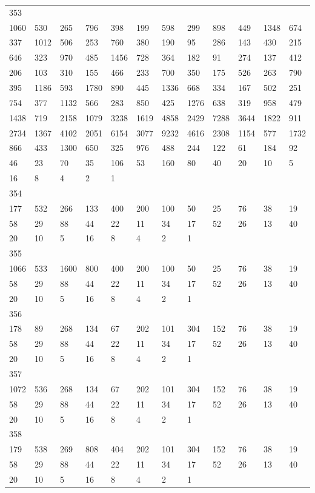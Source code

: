 \begin{longtable}{llllllllllll}
353&&&&&&&&&&&\\
1060& 530& 265& 796& 398& 199& 598& 299& 898& 449& 1348& 674\\
337& 1012& 506& 253& 760& 380& 190& 95& 286& 143& 430& 215\\
646& 323& 970& 485& 1456& 728& 364& 182& 91& 274& 137& 412\\
206& 103& 310& 155& 466& 233& 700& 350& 175& 526& 263& 790\\
395& 1186& 593& 1780& 890& 445& 1336& 668& 334& 167& 502& 251\\
754& 377& 1132& 566& 283& 850& 425& 1276& 638& 319& 958& 479\\
1438& 719& 2158& 1079& 3238& 1619& 4858& 2429& 7288& 3644& 1822& 911\\
2734& 1367& 4102& 2051& 6154& 3077& 9232& 4616& 2308& 1154& 577& 1732\\
866& 433& 1300& 650& 325& 976& 488& 244& 122& 61& 184& 92\\
46& 23& 70& 35& 106& 53& 160& 80& 40& 20& 10& 5\\
16& 8& 4& 2& 1& \\

354&&&&&&&&&&&\\
177& 532& 266& 133& 400& 200& 100& 50& 25& 76& 38& 19\\
58& 29& 88& 44& 22& 11& 34& 17& 52& 26& 13& 40\\
20& 10& 5& 16& 8& 4& 2& 1& \\

355&&&&&&&&&&&\\
1066& 533& 1600& 800& 400& 200& 100& 50& 25& 76& 38& 19\\
58& 29& 88& 44& 22& 11& 34& 17& 52& 26& 13& 40\\
20& 10& 5& 16& 8& 4& 2& 1& \\

356&&&&&&&&&&&\\
178& 89& 268& 134& 67& 202& 101& 304& 152& 76& 38& 19\\
58& 29& 88& 44& 22& 11& 34& 17& 52& 26& 13& 40\\
20& 10& 5& 16& 8& 4& 2& 1& \\

357&&&&&&&&&&&\\
1072& 536& 268& 134& 67& 202& 101& 304& 152& 76& 38& 19\\
58& 29& 88& 44& 22& 11& 34& 17& 52& 26& 13& 40\\
20& 10& 5& 16& 8& 4& 2& 1& \\

358&&&&&&&&&&&\\
179& 538& 269& 808& 404& 202& 101& 304& 152& 76& 38& 19\\
58& 29& 88& 44& 22& 11& 34& 17& 52& 26& 13& 40\\
20& 10& 5& 16& 8& 4& 2& 1& \\


\end{longtable}
